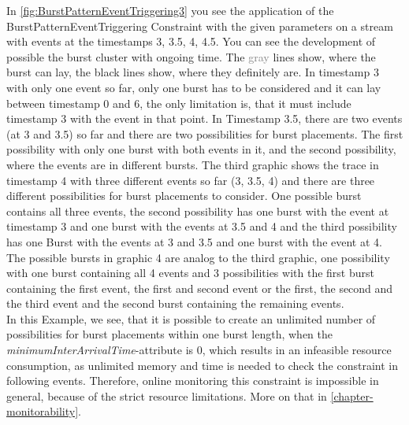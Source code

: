 In \ref{fig:BurstPatternEventTriggering3} you see the application of the BurstPatternEventTriggering Constraint with the given parameters on a stream with events at the timestamps 3, 3.5, 4, 4.5. You can see the development of possible the burst cluster with ongoing time. The \textcolor{gray}{gray} lines show, where the burst can lay, the black lines show, where they definitely are. In timestamp 3 with only one event so far, only one burst has to be considered and it can lay between timestamp 0 and 6, the only limitation is, that it must include timestamp 3 with the event in that point. In Timestamp 3.5, there are two events (at 3 and 3.5) so far and there are two possibilities for burst placements. The first possibility with only one burst with both events in it, and the second possibility, where the events are in different bursts. The third graphic shows the trace in timestamp 4 with three different events so far (3, 3.5, 4) and there are three different possibilities for burst placements to consider. One possible burst contains all three events, the second possibility has one burst with the event at timestamp 3 and one burst with the events at 3.5 and 4 and the third possibility has one Burst with the events at 3 and 3.5 and one burst with the event at 4. The possible bursts in graphic 4 are analog to the third graphic, one possibility with one burst containing all 4 events and 3 possibilities with the first burst containing the first event, the first and second event or the first, the second and the third event and the second burst containing the remaining events.\\
In this Example, we see, that it is possible to create an unlimited number of possibilities for burst placements within one burst length, when the \textit{minimumInterArrivalTime}-attribute is 0, which results in an infeasible resource consumption, as unlimited memory and time is needed to check the constraint in following events. Therefore, online monitoring this constraint is impossible in general, because of the strict resource limitations. More on that in \ref{chapter-monitorability}.

